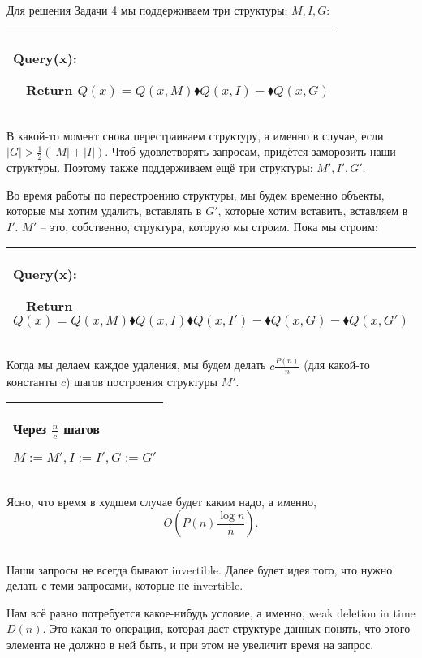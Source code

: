 Для решения Задачи 4 мы поддерживаем три структуры: $M,I,G$:

\begin{tabular}{|p{8cm}|}
\hline
Query(x):

$\quad$Return $Q(x)=Q(x,M)\blacklozenge Q(x,I)-\blacklozenge Q(x,G)$\\
\hline
\end{tabular}


В какой-то момент снова перестраиваем структуру, а именно в случае, если $|G|>\frac{1}{2}(|M|+|I|)$. Чтоб удовлетворять запросам, придётся заморозить наши структуры. Поэтому также поддерживаем ещё три структуры: $M',I',G'$.

Во время работы по перестроению структуры, мы будем временно объекты, которые мы хотим удалить, вставлять в $G'$, которые хотим вставить, вставляем в $I'$. $M'$ -- это, собственно, структура, которую мы строим. Пока мы строим:

\begin{tabular}{|p{11cm}|}
\hline
Query(x):

$\quad$Return $Q(x)=Q(x,M)\blacklozenge Q(x,I) \blacklozenge Q(x,I')-\blacklozenge Q(x,G)-\blacklozenge Q(x,G')$\\
\hline
\end{tabular}


Когда мы делаем каждое удаления, мы будем делать $c\frac{P(n)}{n}$ (для какой-то константы $c$) шагов построения структуры $M'$.

\begin{tabular}{|p{4cm}|}
\hline
Через $\frac{n}{c}$ шагов

$M:=M',I:=I',G:=G'$\\
\hline
\end{tabular}


Ясно, что время в худшем случае будет каким надо, а именно,
\[O\left(P(n)\frac{\log n}{n} \right).\]

\subsection{}

Наши запросы не всегда бывают invertible. Далее будет идея того, что нужно делать с теми запросами, которые не invertible.

Нам всё равно потребуется какое-нибудь условие, а именно, weak deletion in time $D(n)$. Это какая-то операция, которая даст структуре данных понять, что этого элемента не должно в ней быть, и при этом не увеличит время на запрос.

